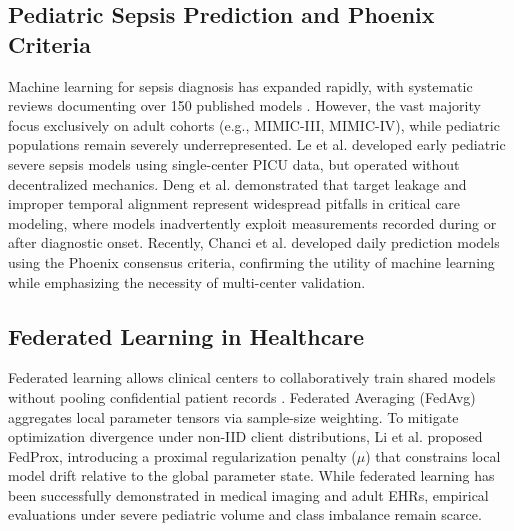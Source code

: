 \documentclass[sigconf,review,anonymous]{acmart}
\begin{document}
\subsection{Pediatric Sepsis Prediction and Phoenix Criteria}
Machine learning for sepsis diagnosis has expanded rapidly, with systematic reviews documenting over 150 published models \cite{fleuren2020ml,yang2023sepsis}. However, the vast majority focus exclusively on adult cohorts (e.g., MIMIC-III, MIMIC-IV), while pediatric populations remain severely underrepresented. Le et al. \cite{le2019pediatric} developed early pediatric severe sepsis models using single-center PICU data, but operated without decentralized mechanics. Deng et al. \cite{deng2022evaluating} demonstrated that target leakage and improper temporal alignment represent widespread pitfalls in critical care modeling, where models inadvertently exploit measurements recorded during or after diagnostic onset. Recently, Chanci et al. \cite{chanci2025machine} developed daily prediction models using the Phoenix consensus criteria, confirming the utility of machine learning while emphasizing the necessity of multi-center validation.

\subsection{Federated Learning in Healthcare}
Federated learning allows clinical centers to collaboratively train shared models without pooling confidential patient records \cite{mcmahan2017fedavg}. Federated Averaging (FedAvg) aggregates local parameter tensors via sample-size weighting. To mitigate optimization divergence under non-IID client distributions, Li et al. \cite{li2020fedprox} proposed FedProx, introducing a proximal regularization penalty ($\mu$) that constrains local model drift relative to the global parameter state. While federated learning has been successfully demonstrated in medical imaging and adult EHRs, empirical evaluations under severe pediatric volume and class imbalance remain scarce.
\end{document}
